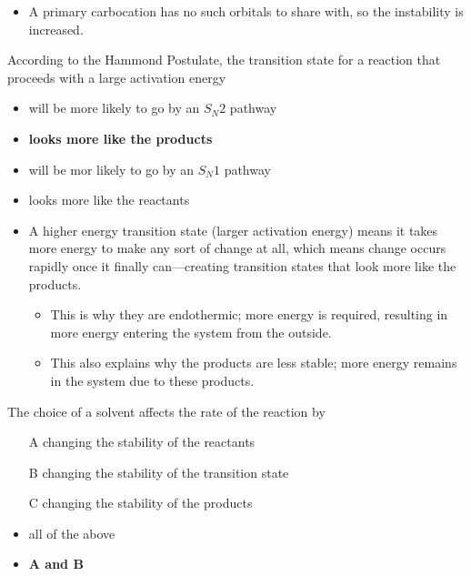 \documentclass[12pt,a4paper]{article}
\begin{document}
\begin{enumerate}
\begin{itemize}
            \item A primary carbocation has no such orbitals to share with, so the instability is increased.
        \end{itemize}
    {\color{G-Moon}\item According to the Hammond Postulate, the transition state for a reaction that proceeds with a large activation energy 
    \begin{itemize}
        \item will be more likely to go by an \(S_N2\) pathway
        \item {\color{o-Sun}\textbf{looks more like the products}}
        \item will be mor likely to go by an \(S_N1\) pathway
        \item looks more like the reactants
    \end{itemize}}
        \begin{itemize}
            \item A higher energy transition state (larger activation energy) means it takes more energy to make any sort of change at all, which means change occurs rapidly once it finally can---creating transition states that look more like the products.
                \begin{itemize}
                    \item This is why they are {\color{o-Sun}endothermic}; more energy is required, resulting in  more energy {\color{o-Sun}entering} the system from the outside.
                    \item This also explains why the products are less stable; more energy remains in the system due to these products.
                \end{itemize}
        \end{itemize}
    {\color{G-Moon}\item The choice of a solvent affects the rate of the reaction by
    \begin{itemize}
        \item[A] changing the stability of the reactants
        \item[B] changing the stability of the transition state
        \item[C] changing the stability of the products
        \item all of the above
        \item {\color{o-Sun}\textbf{A and B}}
    \end{itemize}}
        \begin{itemize}

\end{itemize}
\end{enumerate}
\end{document}

